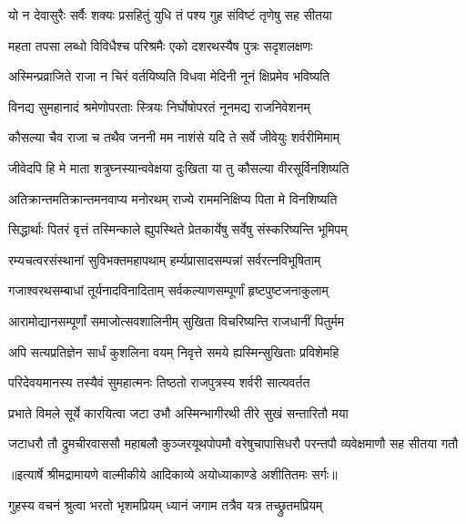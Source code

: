 \twolineshloka
{यो न देवासुरैः सर्वैः शक्यः प्रसहितुं युधि}
{तं पश्य गुह संविष्टं तृणेषु सह सीतया} %

\twolineshloka
{महता तपसा लब्धो विविधैश्च परिश्रमैः}
{एको दशरथस्यैष पुत्रः सदृशलक्षणः} %

\twolineshloka
{अस्मिन्प्रव्राजिते राजा न चिरं वर्तयिष्यति}
{विधवा मेदिनी नूनं क्षिप्रमेव भविष्यति} %

\twolineshloka
{विनद्य सुमहानादं श्रमेणोपरताः स्त्रियः}
{निर्घोषोपरतं नूनमद्य राजनिवेशनम्} %

\twolineshloka
{कौसल्या चैव राजा च तथैव जननी मम}
{नाशंसे यदि ते सर्वे जीवेयुः शर्वरीमिमाम्} %

\twolineshloka
{जीवेदपि हि मे माता शत्रुघ्नस्यान्ववेक्षया}
{दुःखिता या तु कौसल्या वीरसूर्विनशिष्यति} %

\twolineshloka
{अतिक्रान्तमतिक्रान्तमनवाप्य मनोरथम्}
{राज्ये राममनिक्षिप्य पिता मे विनशिष्यति} %

\twolineshloka
{सिद्धार्थाः पितरं वृत्तं तस्मिन्काले ह्युपस्थिते}
{प्रेतकार्येषु सर्वेषु संस्करिष्यन्ति भूमिपम्} %

\twolineshloka
{रम्यचत्वरसंस्थानां सुविभक्तमहापथाम्}
{हर्म्यप्रासादसम्पन्नां सर्वरत्नविभूषिताम्} %

\twolineshloka
{गजाश्वरथसम्बाधां तूर्यनादविनादिताम्}
{सर्वकल्याणसम्पूर्णां हृष्टपुष्टजनाकुलाम्} %

\twolineshloka
{आरामोद्यानसम्पूर्णां समाजोत्सवशालिनीम्}
{सुखिता विचरिष्यन्ति राजधानीं पितुर्मम} %

\twolineshloka
{अपि सत्यप्रतिज्ञेन सार्धं कुशलिना वयम्}
{निवृत्ते समये ह्यस्मिन्सुखिताः प्रविशेमहि} %

\twolineshloka
{परिदेवयमानस्य तस्यैवं सुमहात्मनः}
{तिष्ठतो राजपुत्रस्य शर्वरी सात्यवर्तत} %

\twolineshloka
{प्रभाते विमले सूर्ये कारयित्वा जटा उभौ}
{अस्मिन्भागीरथी तीरे सुखं सन्तारितौ मया} %

\fourlineindentedshloka
{जटाधरौ तौ द्रुमचीरवाससौ}
{महाबलौ कुञ्जरयूथपोपमौ}
{वरेषुचापासिधरौ परन्तपौ}
{व्यवेक्षमाणौ सह सीतया गतौ} %


{॥इत्यार्षे श्रीमद्रामायणे वाल्मीकीये आदिकाव्ये अयोध्याकाण्डे अशीतितमः सर्गः॥}


\twolineshloka
{गुहस्य वचनं श्रुत्वा भरतो भृशमप्रियम्}
{ध्यानं जगाम तत्रैव यत्र तच्छ्रुतमप्रियम्} %

